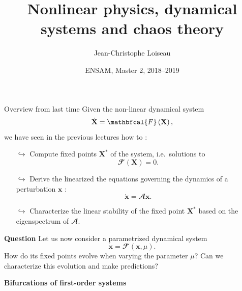 \documentclass[usenames,dvipsnames,svgnames,10pt,aspectratio=169]{beamer}
\title[Nonlinear Physics] %
{
	Nonlinear physics, dynamical \\ systems and chaos theory
}
\author[J.-Ch.~Loiseau] %
{
	Jean-Christophe Loiseau
}
\institute[unused]
{
	\url{jean-christophe.loiseau@ensam.eu} \\
	DynFluid, \\
	Arts et M\'etiers ParisTech, France
}
\date[unused]{ENSAM, Master 2, 2018--2019}
\begin{document}
\titleframe %


\begin{frame}[t, c]{Overview from last time}{}
	Given the non-linear dynamical system
	\begin{equation}
		\dot{\mathbf{X}} = \mathbfcal{F}\left( \mathbf{X} \right),
		\notag
	\end{equation}
	we have seen in the previous lectures how to :
	\begin{itemize}
		\item[$\hookrightarrow$] Compute fixed points $\mathbf{X}^*$ of the system, i.e.\ solutions to
		$$\mathbfcal{F}\left( \mathbf{X} \right) = 0.$$

		\item[$\hookrightarrow$] Derive the linearized the equations governing the dynamics of a perturbation $\mathbf{x}$ :
		$$\dot{\mathbf{x}} = \mathbfcal{A} \mathbf{x}.$$

		\item[$\hookrightarrow$] Characterize the linear stability of the fixed point $\mathbf{X}^*$ based on the eigenspectrum of $\mathbfcal{A}$.
	\end{itemize}

	\vspace{1cm}
\end{frame}

\begin{frame}[t, c]{}{}
	\begin{block}{\centering \textbf{Question}}
		Let us now consider a parametrized dynamical system
		$$\dot{\mathbf{x}} = \mathbfcal{F}\left( \mathbf{x}, \mu \right).$$
		How do its fixed points evolve when varying the parameter $\mu$? Can we characterize this evolution and make predictions?
	\end{block}
\end{frame}

\begin{frame}[t, c]{}
	\centering
	\vspace{1cm}

	{\Large \textbf{Bifurcations of first-order systems}}

	\bigskip

	{}

\end{frame}
\end{document}
